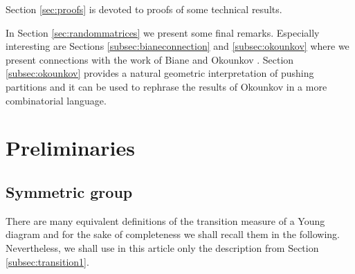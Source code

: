 \documentclass[12pt,dvips]{amsart}
\numberwithin{equation}{section} \numberwithin{figure}{section}
\theoremstyle{plain}
\theoremstyle{definition}
\theoremstyle{remark}
\newcommand{\cytat}[1]{}
\begin{document}
Section \ref{sec:proofs} is devoted to proofs of some technical
results.

In Section \ref{sec:randommatrices} we present some final remarks.
Especially interesting are Sections \ref{subsec:bianeconnection} and
\ref{subsec:okounkov} where we present connections with the work of
Biane \cite{Biane1998} and Okounkov
\cite{Okounkov2000randompermutations}. Section \ref{subsec:okounkov}
provides a natural geometric interpretation of pushing partitions
and it can be used to rephrase the results of Okounkov in a more
combinatorial language.






%
%
%
%
%
%





%





\section{Preliminaries}
\label{sec:preliminaries}

\cytat{
\begin{quotation}
{\it Ko\'n, jaki jest, ka\.zdy widzi.} \\ \textsc{Benedykt
Chmielowski, `Nowe Ateny albo Akademia wszelkiej sciencyi pe\l{}na'}
\end{quotation}
}



\subsection{Symmetric group}
There are many equivalent definitions of the transition measure of a
Young diagram
\cite{VershikKerov1995asymptoticbehavior,Kerov1993transition,
Kerov1999differential,OkounkovVershik1996,
Biane1998,Okounkov2000randompermutations} and for the sake of
completeness we shall recall them in the following. Nevertheless, we
shall use in this article only the description from Section
\ref{subsec:transition1}.
\end{document}
